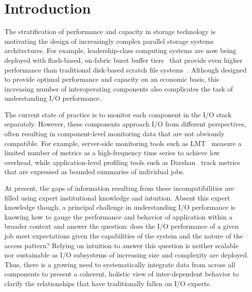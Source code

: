\section{Introduction} \label{sec:introduction}

The stratification of performance and capacity in storage technology is motivating the design of increasingly complex parallel storage systems architectures.
For example, leadership-class computing systems are now being deployed with flash-based, on-fabric burst buffer tiers~\cite{Henseler2016} that provide even higher performance than traditional disk-based scratch file systems~\cite{Bhimji2016}.
Although designed to provide optimal performance and capacity on an economic basis, this increasing number of interoperating components also complicates the task of understanding I/O performance.

The current state of practice is to monitor each component in the I/O stack separately.
However, these components approach I/O from different perspectives, often resulting in component-level monitoring data that are not obviously compatible.
For example, server-side monitoring tools such as LMT~\cite{lmt} measure a limited number of metrics as a high-frequency time series to achieve low overhead, while application-level profiling tools such as Darshan~\cite{carns200924} track metrics that are expressed as bounded
summaries of individual jobs.

At present, the gaps of information resulting from these incompatibilities are filled using expert institutional knowledge and intuition.
Absent this expert knowledge though, a principal challenge in understanding I/O performance is knowing how to gauge the performance and behavior of application within a broader context and answer the question: 
does the I/O performance of a given job meet expectations given the capabilities of the system and the nature of the access pattern?
Relying on intuition to answer this question is neither scalable nor sustainable as I/O subsystems of increasing size and complexity are deployed.
Thus, there is a growing need to systematically integrate data from across all components to present a coherent, holistic view of inter-dependent behavior to clarify the relationships that have traditionally fallen on I/O experts.


